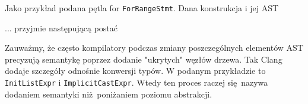 			Jako przykład podana pętla for \texttt{ForRangeStmt}. Dana konstrukcja i jej AST

			
			

			... przyjmie następującą postać

			
				        
			\newpage

	        Zauważmy, że często kompilatory podczas zmiany poszczególnych elementów AST
	        precyzują semantykę poprzez dodanie "ukrytych" węzłów drzewa. Tak Clang
	        dodaje szczegóły odnośnie konwersji typów. W podanym przykładzie to
	        \texttt{InitListExpr} i \texttt{ImplicitCastExpr}. Wtedy ten proces raczej
	        się nazywa dodaniem semantyki niż poniżaniem poziomu abstrakcji.

			
			
